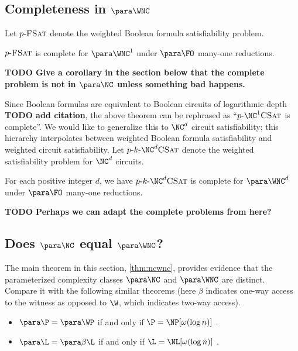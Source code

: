 \documentclass{article}
\newcommand{\todo}[1]{\textbf{TODO #1}}
\newcommand{\dash}{\textnormal{-}}
\begin{document}
\subsection{Completeness in \texorpdfstring{$\para \WNC$}{paraWNC}}

Let $p \dash \textsc{FSat}$ denote the weighted Boolean formula satisfiability problem.

\begin{theorem}\label{thm:parawnc1complete}
  $p \dash \textsc{FSat}$ is complete for $\para \WNC^1$ under $\para \FO$ many-one reductions.
\end{theorem}

\todo{Give a corollary in the section below that the complete problem is not in $\para \NC$ unless something bad happens.}

Since Boolean formulas are equivalent to Boolean circuits of logarithmic depth \todo{add citation}, the above theorem can be rephrased as ``$p \dash \NC^1 \textsc{CSat}$ is complete''.
We would like to generalize this to $\NC^d$ circuit satisfiability; this hierarchy interpolates between weighted Boolean formula satisfiability and weighted circuit satisfiability.
Let $p \dash k \dash \NC^d \textsc{CSat}$ denote the weighted satisfiability problem for $\NC^d$ circuits.

\begin{conjecture}\label{con:parawncdcomplete}
  For each positive integer $d$, we have $p \dash k \dash \NC^d \textsc{CSat}$ is complete for $\para \WNC^d$ under $\para \FO$ many-one reductions.
\end{conjecture}

\todo{Perhaps we can adapt the complete problems from \autocite{cc97lim} here?}

\subsection{Does \texorpdfstring{$\para \NC$}{paraNC} equal \texorpdfstring{$\para \WNC$}{paraWNC}?}
\label{sec:fppwpp}

The main theorem in this section, \autoref{thm:ncwnc}, provides evidence that the parameterized complexity classes $\para \NC$ and $\para \WNC$ are distinct.
Compare it with the following similar theorems (here $\beta$ indicates one-way access to the witness as opposed to $\W$, which indicates two-way access).
\begin{itemize}
\item $\para \P = \para \WP$ if and only if $\P = \NP[\omega(\log n)]$ \autocite[Theorem~3.29]{fg06}.
\item $\para \L = \para \beta \L$ if and only if $\L = \NL[\omega(\log n)]$ \autocite[Theorem~15]{cm14}.
\end{itemize}
\end{document}
